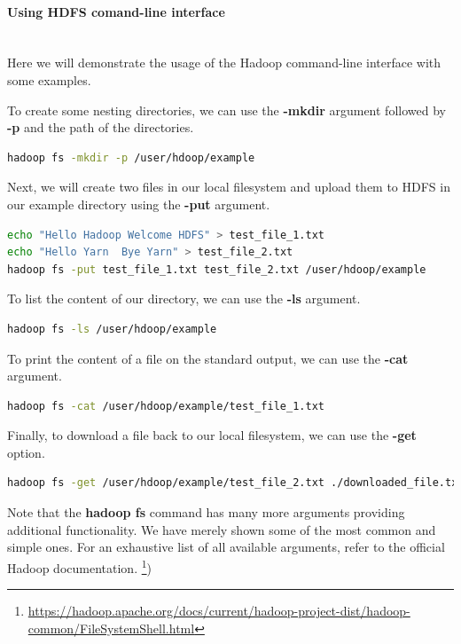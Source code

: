 \documentclass[12pt,english]{book}
\begin{document}
\paragraph{Using HDFS comand-line interface}\mbox{}\\

Here we will demonstrate the usage of the Hadoop command-line interface with some examples.

To create some nesting directories, we can use the \textbf{-mkdir} argument followed by \textbf{-p} and the path of the directories.

\begin{lstlisting}[language=bash, frame=single]
hadoop fs -mkdir -p /user/hdoop/example
\end{lstlisting}

Next, we will create two files in our local filesystem and upload them to HDFS in our example directory using the \textbf{-put} argument.

\begin{lstlisting}[language=bash, frame=single]
echo "Hello Hadoop Welcome HDFS" > test_file_1.txt
echo "Hello Yarn  Bye Yarn" > test_file_2.txt
hadoop fs -put test_file_1.txt test_file_2.txt /user/hdoop/example
\end{lstlisting}

To list the content of our directory, we can use the \textbf{-ls} argument.

\begin{lstlisting}[language=bash, frame=single]
hadoop fs -ls /user/hdoop/example
\end{lstlisting}

To print the content of a file on the standard output, we can use the \textbf{-cat} argument.

\begin{lstlisting}[language=bash, frame=single]
hadoop fs -cat /user/hdoop/example/test_file_1.txt
\end{lstlisting}

Finally, to download a file back to our local filesystem, we can use the \textbf{-get} option.

\begin{lstlisting}[language=bash, frame=single]
hadoop fs -get /user/hdoop/example/test_file_2.txt ./downloaded_file.txt
\end{lstlisting}

Note that the \textbf{hadoop fs} command has many more arguments providing additional functionality.
We have merely shown some of the most common and simple ones.
For an exhaustive list of all available arguments, refer to the official Hadoop documentation. \footnote{\url{https://hadoop.apache.org/docs/current/hadoop-project-dist/hadoop-common/FileSystemShell.html}}) 
\end{document}
